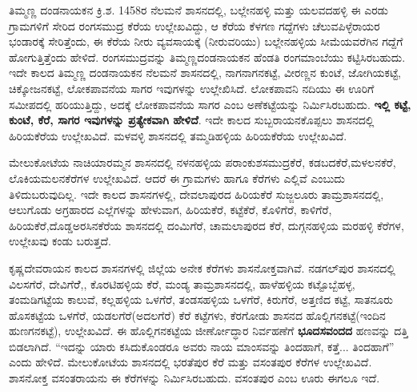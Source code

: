 ತಿಮ್ಮಣ್ಣ ದಂಡನಾಯಕನ ಕ್ರಿ.ಶ. 1458ರ ನೆಲಮನೆ ಶಾಸನದಲ್ಲಿ, ಬಲ್ಲೇನಹಳ್ಳಿ ಮತ್ತು ಯಲವದಹಳ್ಳಿ ಈ ಎರಡು ಗ್ರಾಮಗಳಿಗೆ ಸೇರಿದ ರಂಗಸಮುದ್ರ ಕೆರೆಯ ಉಲ್ಲೇಖವಿದ್ದು, ಆ ಕೆರೆಯ ಕೆಳಗಣ ಗದ್ದೆಗಳು ಚೆಲುವಪಿಳ್ಳೆರಾಯರ ಭಂಡಾರಕ್ಕೆ ಸೇರಿತ್ತೆಂದು, ಈ ಕೆರೆಯ ನೀರು ವ್ಯವಸಾಯಕ್ಕೆ (ನೀರುವರಿಯು) ಬಲ್ಲೇನಹಳ್ಳಿಯ ಸೀಮೆಯವರೆಗಿನ ಗದ್ದೆಗೆ ಹೋಗುತ್ತಿತ್ತೆಂದು ಹೇಳಿದೆ. ರಂಗಸಮುದ್ರವನ್ನು ತಿಮ್ಮಣ್ಣದಂಡನಾಯಕನ ಹೆಂಡತಿ ರಂಗಮಾಂಬೆಯು ಕಟ್ಟಿಸಿರಬಹುದು. ಇದೇ ಕಾಲದ ತಿಮ್ಮಣ್ಣ ದಂಡನಾಯಕನ ನೆಲಮನೆ ಶಾಸನದಲ್ಲಿ, ನಾಗನಾಗನಕಟ್ಟೆ, ವೀರಣ್ಣನ ಕುಂಟೆ, ಜೋಗಿಯಕಟ್ಟೆ, ಚಿಕ್ಕೋಜನಕಟ್ಟೆ, ಲೋಕಪಾವನೆಯ ಸಾಗರ ಇವುಗಳನ್ನು ಉಲ್ಲೇಖಿಸಿದೆ. ಲೋಕಪಾವನಿ ನದಿಯು ಈ ಊರಿಗೆ ಸಮೀಪದಲ್ಲಿ ಹರಿಯುತ್ತಿದ್ದು, ಅದಕ್ಕೆ ಲೋಕಪಾವನೆಯ ಸಾಗರ ಎಂಬ ಅಣೆಕಟ್ಟೆಯನ್ನು ನಿರ್ಮಿಸಿರಬಹುದು. \textbf{ಇಲ್ಲಿ ಕಟ್ಟೆ, ಕುಂಟೆ, ಕೆರೆ, ಸಾಗರ ಇವುಗಳನ್ನು ಪ್ರತ್ಯೇಕವಾಗಿ ಹೇಳಿದೆ}. ಇದೇ ಕಾಲದ ಸುಬ್ಬರಾಯನಕೊಪ್ಪಲು ಶಾಸನದಲ್ಲಿ ಹಿರಿಯಕೆರೆಯ ಉಲ್ಲೇಖವಿದೆ. ಮಳವಳ್ಳಿ ಶಾಸನದಲ್ಲಿ ತಮ್ಮಡಿಹಳ್ಳಿಯ ಹಿರಿಯಕೆರೆಯ ಉಲ್ಲೇಖವಿದೆ.

ಮೇಲುಕೋಟೆಯ ನಾಚಿಯಾರಮ್ಮನ ಶಾಸನದಲ್ಲಿ ನಳನಹಳ್ಳಿಯ ಪರಾಂಕುಶಸಮುದ್ರಕೆರೆ, ಕಡಬದಕೆರೆ,\break ಮಳಲನಕೆರೆ, ಲೊಕಿಯಮಲನಕೆರೆಗಳ ಉಲ್ಲೇಖವಿದೆ. ಆದರೆ ಈ ಗ್ರಾಮಗಳು ಹಾಗೂ ಕೆರೆಗಳು ಎಲ್ಲಿವೆ ಎಂಬುದು ತಿಳಿದುಬರುವುದಿಲ್ಲ. ಇದೇ ಕಾಲದ ಶಾಸನಗಳಲ್ಲಿ, ದೇವಲಾಪುರದ ಹಿರಿಯಕೆರೆ ಸುಜ್ಜಲೂರು ತಾಮ್ರಶಾಸನದಲ್ಲಿ, ಆಲುಗೊಡು ಅಗ್ರಹಾರದ ಎಲ್ಲೆಗಳನ್ನು ಹೇಳುವಾಗ, ಹಿರಿಯಕೆರೆ, ಕಟ್ಟೆಕೆರೆ, ಕೊಳಿಗೆರೆ, ಕಾಳಿಗೆರೆ, ಹಿರಿಯಕೆರೆ,\break ದೊಡ್ಡಅರಸಿನಕೆರೆಯ ಶಾಸನದಲ್ಲಿ ದಂಮಿಗೆರೆ, ಚಾಮಲಾಪುರದ ಕೆರೆ, ದುಗ್ಗನಹಳ್ಳಿಯ ಮರಹಳ್ಳಿ ಕೆರೆಗಳ, ಉಲ್ಲೇಖವು ಕಂಡು ಬರುತ್ತದೆ.

ಕೃಷ್ಣದೇವರಾಯನ ಕಾಲದ ಶಾಸನಗಳಲ್ಲಿ ಜಿಲ್ಲೆಯ ಅನೇಕ ಕೆರೆಗಳು ಶಾಸನೋಕ್ತವಾಗಿವೆ. ನಡಗಲ್​ಪುರ ಶಾಸನದಲ್ಲಿ ವಿಲಸಗೆರೆ, ದೇವಿಗೆರೆೆ,, ಕೊರಟಿಹಳ್ಳಿಯ ಕೆರೆ, ಮಂಡ್ಯ ತಾಮ್ರಶಾಸನದಲ್ಲಿ, ಹಾಳೆಹಳ್ಳಿಯ ಕಟ್ಟೊಬ್ಬೆಹಳ್ಳ, ತಂಮಡಿಗಟ್ಟೆಯ ಕಾಲುವೆ, ಕಲ್ಲಹಳ್ಳಿಯ ಒಳಗೆರೆ, ತಂಡಸಹಳ್ಳಿಯ ಒಳಗೆರೆ, ಕಿರುಗೆರೆ, ಅತ್ತಣಿದ ಕಟ್ಟೆ, ಸಾತನೂರು ಹೊಸಕಟ್ಟೆಯ ಒಳಗೆರೆ, ಯಡಲಗೆರೆ(ಅದಲಗೆರೆ) ಕೆರೆ ಕಟ್ಟೆಗಳು, ಕೆರಗೋಡು ಶಾಸನದ ಹೊಲ್ಲಿಗನಕಟ್ಟೆ(ಇಂದಿನ ಹುಣಗನಕಟ್ಟೆ), ಉಲ್ಲೇಖವಿದೆ. ಈ ಹೊಲ್ಲಿಗನಕಟ್ಟೆಯ ಜೀರ್ಣೋದ್ಧಾರ ನಿರ್ವಹಣೆಗೆ \textbf{ಭೂದಸವಂದದ} ಹಣವನ್ನು ದತ್ತಿ ಬಿಡಲಾಗಿದೆ. “ಇದನ್ನು ಯಾರು ಕಸಿದುಕೊಂಡರೂ ಅವರು ನಾಯ ಮಾಂಸವನ್ನು ತಿಂದಹಾಗೆ, ಕತ್ತೆ... ತಿಂದಹಾಗೆ” ಎಂದು ಹೇಳಿದೆ. ಮೇಲುಕೋಟೆಯ ಶಾಸನದಲ್ಲಿ ಭರತೆಪುರ ಕೆರೆ ಮತ್ತು ವಸಂತಪುರ ಕೆರೆಗಳ ಉಲ್ಲೇಖವಿದೆ. ಶಾಸನೋಕ್ತ ವಸಂತರಾಯನು ಈ ಕೆರೆಗಳನ್ನು ನಿರ್ಮಿಸಿರಬಹುದು. ವಸಂತಪುರ ಎಂಬ ಊರು ಈಗಲೂ ಇದೆ.

